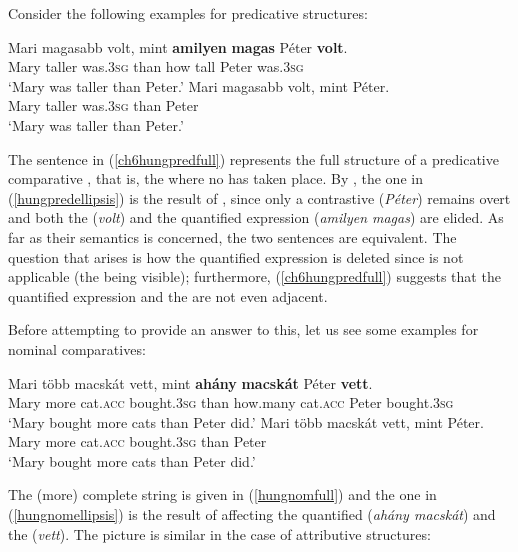 Consider the following examples for predicative structures:

\ea \label{ch6hungpred}
\ea	\gll Mari	magasabb	volt,	mint	\textbf{amilyen}	\textbf{magas}	Péter \textbf{volt}. \label{ch6hungpredfull}\\
Mary	taller	was.\textsc{3sg}	than	how	tall	Peter was.\textsc{3sg}\\
\glt `Mary was taller than Peter.'
\ex \gll	Mari	magasabb	volt,	mint	Péter. \label{hungpredellipsis}\\
Mary	taller	was.\textsc{3sg}	than	Peter\\
\glt `Mary was taller than Peter.'
\z
\z
		
The sentence in (\ref{ch6hungpredfull}) represents the full structure of a predicative comparative , that is, the  where no  has taken place. By , the one in (\ref{hungpredellipsis}) is the result of , since only a contrastive  (\textit{Péter}) remains overt and both the  (\textit{volt}) and the quantified expression (\textit{amilyen magas}) are elided. As far as their semantics is concerned, the two sentences are equivalent. The question that arises is how the quantified expression is deleted since  is not applicable (the  being visible); furthermore, (\ref{ch6hungpredfull}) suggests that the quantified expression and the  are not even adjacent.

Before attempting to provide an answer to this, let us see some examples for nominal comparatives:

\ea \label{hungnom}
\ea \gll Mari	több macskát vett, mint	\textbf{ahány} \textbf{macskát} Péter \textbf{vett}. \label{hungnomfull}\\
Mary more	cat.\textsc{acc} bought.\textsc{3sg} than	how.many cat.\textsc{acc} Peter bought.\textsc{3sg}\\
\glt `Mary bought more cats than Peter did.'
\ex \gll Mari	több macskát vett, mint	Péter. \label{hungnomellipsis}\\
Mary more	cat.\textsc{acc} bought.\textsc{3sg} than Peter\\
\glt `Mary bought more cats than Peter did.'
\z
\z
		
The (more) complete string is given in (\ref{hungnomfull}) and the one in (\ref{hungnomellipsis}) is the result of  affecting the quantified  (\textit{ahány macskát}) and the  (\textit{vett}). The picture is similar in the case of attributive structures:

